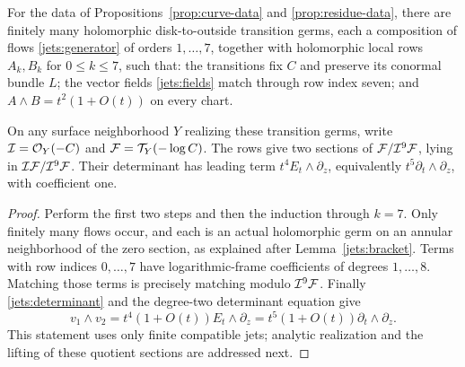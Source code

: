 \begin{proposition}\label{prop:jets}
For the data of Propositions~\ref{prop:curve-data} and
\ref{prop:residue-data}, there are finitely many holomorphic
disk-to-outside transition germs, each a composition of flows
\eqref{jets:generator} of orders $1,\ldots,7$, together with
holomorphic local rows $A_k,B_k$ for $0\leq k\leq7$, such that:
the transitions fix $C$ and preserve its conormal bundle $L$;
the vector fields \eqref{jets:fields} match through row index seven;
and $A\wedge B=t^2(1+O(t))$ on every chart.

On any surface neighborhood $Y$ realizing these transition germs,
write $\mathcal I=\mathcal O_Y(-C)$ and $\mathcal F=\mathcal T_Y(-\log C)$.
The rows give two sections of $\mathcal F/\mathcal I^9\mathcal F$, lying in
$\mathcal I\mathcal F/\mathcal I^9\mathcal F$.  Their determinant has leading term
$t^4E_t\wedge\partial_z$, equivalently
$t^5\partial_t\wedge\partial_z$, with coefficient one.
\end{proposition}

\begin{proof}
Perform the first two steps and then the induction through $k=7$.
Only finitely many flows occur, and each is an actual holomorphic
germ on an annular neighborhood of the zero section, as explained
after Lemma~\ref{jets:bracket}.  Terms with row indices $0,\ldots,7$
have logarithmic-frame coefficients of degrees $1,\ldots,8$.
Matching those terms is precisely matching modulo $\mathcal I^9\mathcal F$.
Finally \eqref{jets:determinant} and the degree-two determinant
equation give
\[
 v_1\wedge v_2=t^4(1+O(t))E_t\wedge\partial_z
             =t^5(1+O(t))\partial_t\wedge\partial_z.
\]
This statement uses only finite compatible jets; analytic realization
and the lifting of these quotient sections are addressed next.
\end{proof}

